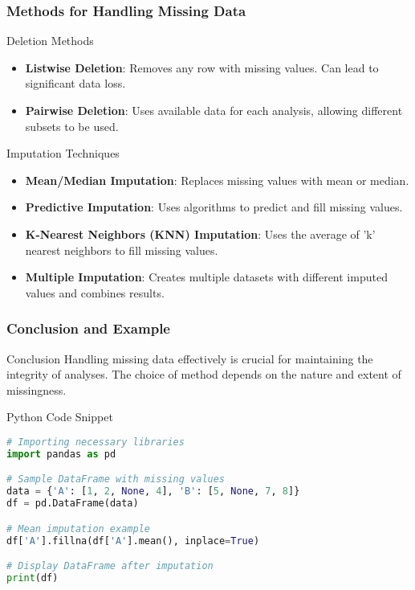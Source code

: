 \documentclass[aspectratio=169]{beamer}
\begin{document}
\begin{frame}[fragile]
    \frametitle{Methods for Handling Missing Data}
    
    \begin{block}{Deletion Methods}
        \begin{itemize}
            \item \textbf{Listwise Deletion}: Removes any row with missing values. Can lead to significant data loss.
            \item \textbf{Pairwise Deletion}: Uses available data for each analysis, allowing different subsets to be used.
        \end{itemize}
    \end{block}

    \begin{block}{Imputation Techniques}
        \begin{itemize}
            \item \textbf{Mean/Median Imputation}: Replaces missing values with mean or median.
            \item \textbf{Predictive Imputation}: Uses algorithms to predict and fill missing values. 
            \item \textbf{K-Nearest Neighbors (KNN) Imputation}: Uses the average of 'k' nearest neighbors to fill missing values.
            \item \textbf{Multiple Imputation}: Creates multiple datasets with different imputed values and combines results.
        \end{itemize}
    \end{block}
\end{frame}

\begin{frame}[fragile]
    \frametitle{Conclusion and Example}
    \begin{block}{Conclusion}
        Handling missing data effectively is crucial for maintaining the integrity of analyses. The choice of method depends on the nature and extent of missingness.
    \end{block}

    \begin{block}{Python Code Snippet}
        \begin{lstlisting}[language=Python]
# Importing necessary libraries
import pandas as pd

# Sample DataFrame with missing values
data = {'A': [1, 2, None, 4], 'B': [5, None, 7, 8]}
df = pd.DataFrame(data)

# Mean imputation example
df['A'].fillna(df['A'].mean(), inplace=True)

# Display DataFrame after imputation
print(df)
        \end{lstlisting}
    \end{block}
\end{frame}
\end{document}
